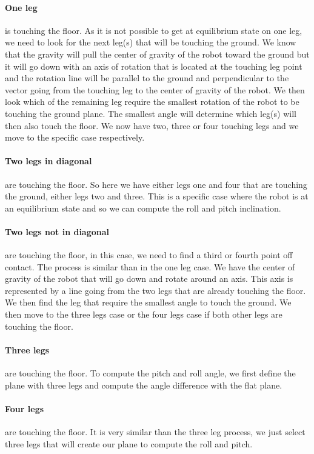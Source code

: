             \paragraph{One leg} is touching the floor. As it is not possible to get at equilibrium state on one leg, we need to look for the next leg(s) that will be touching the ground. We know that the gravity will pull the center of gravity of the robot toward the ground but it will go down with an axis of rotation that is located at the touching leg point and the rotation line will be parallel to the ground and perpendicular to the vector going from the touching leg to the center of gravity of the robot. We then look which of the remaining leg require the smallest rotation of the robot to be touching the ground plane. The smallest angle will determine which leg(s) will then also touch the floor. We now have two, three or four touching legs and we move to the specific case respectively.
            \paragraph{Two legs in diagonal} are touching the floor. So here we have either legs one and four that are touching the ground, either legs two and three. This is a specific case where the robot is at an equilibrium state and so we can compute the roll and pitch inclination. 
            \paragraph{Two legs not in diagonal} are touching the floor, in this case, we need to find a third or fourth point off contact. The process is similar than in the one leg case. We have the center of gravity of the robot that will go down and rotate around an axis. This axis is represented by a line going from the two legs that are already touching the floor. We then find the leg that require the smallest angle to touch the ground. We then move to the three legs case or the four legs case if both other legs are touching the floor. 
            \paragraph{Three legs} are touching the floor. To compute the pitch and roll angle, we first define the plane with three legs and compute the angle difference with the flat plane. 
            \paragraph{Four legs} are touching the floor. It is very similar than the three leg process, we just select three legs that will create our plane to compute the roll and pitch.
            \\
            
